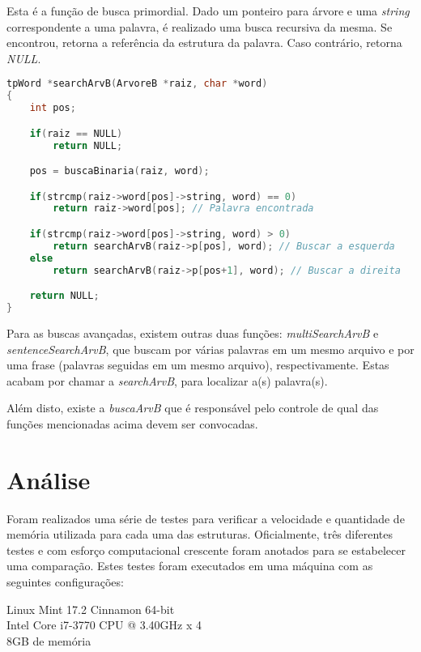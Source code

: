 \documentclass[
	11pt,				%
	oneside,			%
	a4paper,			%
	english,			%
	brazil,				%
	]{article}
\begin{document}
Esta é a função de busca primordial. Dado um ponteiro para árvore e uma \textit{string} correspondente a uma palavra, é realizado uma busca recursiva da mesma. Se encontrou, retorna a referência da estrutura da palavra. Caso contrário, retorna \textit{NULL}.
\begin{lstlisting}[language=C, caption=Função de busca]
tpWord *searchArvB(ArvoreB *raiz, char *word)
{
    int pos;

    if(raiz == NULL)
        return NULL;

    pos = buscaBinaria(raiz, word);

    if(strcmp(raiz->word[pos]->string, word) == 0)
        return raiz->word[pos]; // Palavra encontrada 

    if(strcmp(raiz->word[pos]->string, word) > 0)
        return searchArvB(raiz->p[pos], word); // Buscar a esquerda
    else
        return searchArvB(raiz->p[pos+1], word); // Buscar a direita 

    return NULL;
}
\end{lstlisting}

Para as buscas avançadas, existem outras duas funções: \textit{multiSearchArvB} e \textit{sentenceSearchArvB}, que buscam por várias palavras em um mesmo arquivo e por uma frase (palavras seguidas em um mesmo arquivo), respectivamente. Estas acabam por chamar a \textit{searchArvB}, para localizar a(s) palavra(s).

Além disto, existe a \textit{buscaArvB} que é responsável pelo controle de qual das funções mencionadas acima devem ser convocadas.

\section{Análise}
Foram realizados uma série de testes para verificar a velocidade e quantidade de memória utilizada para cada uma das estruturas. Oficialmente, três diferentes testes e com esforço computacional crescente foram anotados para se estabelecer uma comparação.
Estes testes foram executados em uma máquina com as seguintes configurações:

Linux Mint 17.2 Cinnamon 64-bit \\
\indent Intel Core i7-3770 CPU @ 3.40GHz x 4 \\
\indent 8GB de memória
\end{document}

